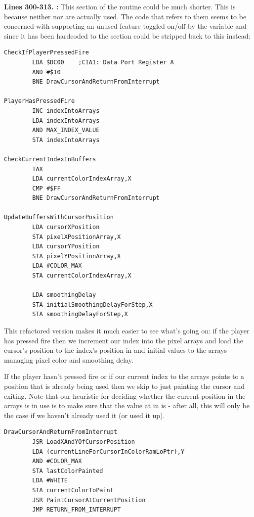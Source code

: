\textbf{Lines 300-313. :} This section of the routine could be much shorter. This
is because neither  nor  are actually used. The code that refers
to them seems to be concerned with supporting an unused feature toggled on/off by the variable 
and since it has been hardcoded to  the section could be stripped back to this instead:

\begin{lstlisting}[basicstyle=\ttfamily\scriptsize]
CheckIfPlayerPressedFire   
        LDA $DC00    ;CIA1: Data Port Register A
        AND #$10
        BNE DrawCursorAndReturnFromInterrupt

PlayerHasPressedFire
        INC indexIntoArrays
        LDA indexIntoArrays
        AND MAX_INDEX_VALUE
        STA indexIntoArrays

CheckCurrentIndexInBuffers  
        TAX 
        LDA currentColorIndexArray,X
        CMP #$FF
        BNE DrawCursorAndReturnFromInterrupt

UpdateBuffersWithCursorPosition
        LDA cursorXPosition
        STA pixelXPositionArray,X
        LDA cursorYPosition
        STA pixelYPositionArray,X
        LDA #COLOR_MAX
        STA currentColorIndexArray,X

        LDA smoothingDelay
        STA initialSmoothingDelayForStep,X
        STA smoothingDelayForStep,X
\end{lstlisting}

This refactored version makes it much easier to see what's going on: if the player has pressed fire then we increment
our index into the pixel arrays and load the cursor's position to the index's position in 
and initial values to the arrays managing pixel color and smoothing delay.

If the player hasn't pressed fire or if our current index to the arrays points to a position that is already being used then
we skip to just painting the cursor and exiting. Note that our heuristic for deciding whether the current position in the 
arrays is in use is to make sure that the value at  in  is  - 
after all, this will only be the case if we haven't already used it (or used it up).

\clearpage
\clearpage
\begin{lstlisting}[caption = Paint the cursor and call the system default interrupt handler \icode{RETURN\_FROM\_INTERRUPT}]
DrawCursorAndReturnFromInterrupt   
        JSR LoadXAndYOfCursorPosition
        LDA (currentLineForCursorInColorRamLoPtr),Y
        AND #COLOR_MAX
        STA lastColorPainted
        LDA #WHITE
        STA currentColorToPaint
        JSR PaintCursorAtCurrentPosition
        JMP RETURN_FROM_INTERRUPT

\end{lstlisting}

